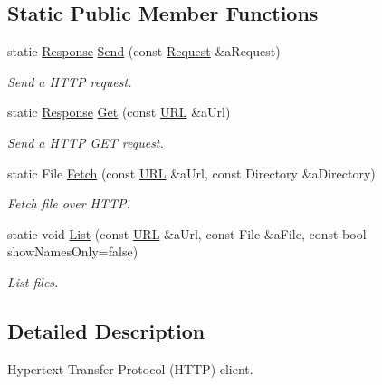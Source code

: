 \subsection*{Static Public Member Functions}
\begin{DoxyCompactItemize}
\item 
static \hyperlink{classlibrary_1_1io_1_1ip_1_1tcp_1_1http_1_1_response}{Response} \hyperlink{classlibrary_1_1io_1_1ip_1_1tcp_1_1http_1_1_client_adb337267064f9d3f2530af896f7e8df8}{Send} (const \hyperlink{classlibrary_1_1io_1_1ip_1_1tcp_1_1http_1_1_request}{Request} \&a\+Request)
\begin{DoxyCompactList}\small\item\em Send a H\+T\+TP request. \end{DoxyCompactList}\item 
static \hyperlink{classlibrary_1_1io_1_1ip_1_1tcp_1_1http_1_1_response}{Response} \hyperlink{classlibrary_1_1io_1_1ip_1_1tcp_1_1http_1_1_client_a1c3b8e761e1cca7c7f9737d06a42fed0}{Get} (const \hyperlink{classlibrary_1_1io_1_1_u_r_l}{U\+RL} \&a\+Url)
\begin{DoxyCompactList}\small\item\em Send a H\+T\+TP G\+ET request. \end{DoxyCompactList}\item 
static File \hyperlink{classlibrary_1_1io_1_1ip_1_1tcp_1_1http_1_1_client_a1e9b292adc7e6b2341889c4a7279204c}{Fetch} (const \hyperlink{classlibrary_1_1io_1_1_u_r_l}{U\+RL} \&a\+Url, const Directory \&a\+Directory)
\begin{DoxyCompactList}\small\item\em Fetch file over H\+T\+TP. \end{DoxyCompactList}\item 
static void \hyperlink{classlibrary_1_1io_1_1ip_1_1tcp_1_1http_1_1_client_ae585272907c339788327a65298ec29ba}{List} (const \hyperlink{classlibrary_1_1io_1_1_u_r_l}{U\+RL} \&a\+Url, const File \&a\+File, const bool show\+Names\+Only=false)
\begin{DoxyCompactList}\small\item\em List files. \end{DoxyCompactList}\end{DoxyCompactItemize}


\subsection{Detailed Description}
Hypertext Transfer Protocol (H\+T\+TP) client. 


